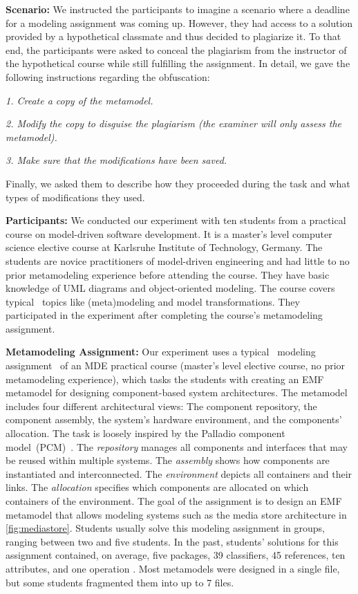 \textbf{Scenario:}
We instructed the participants to imagine a scenario where a deadline for a modeling assignment was coming up. However, they had access to a solution provided by a hypothetical classmate and thus decided to plagiarize it. To that end, the participants were asked to conceal the plagiarism from the instructor of the hypothetical course while still fulfilling the assignment.
In detail, we gave the following instructions regarding the obfuscation:

\begin{myquote}
\textit{1. Create a copy of the metamodel.}
    
\textit{2. Modify the copy to disguise the plagiarism (the examiner will only assess the metamodel).}
    
\textit{3. Make sure that the modifications have been saved.}
\end{myquote}

Finally, we asked them to describe how they proceeded during the task and what types of modifications they used.

\textbf{Participants:}
We conducted our experiment with ten students from a practical course on model-driven software development.
It is a master's level computer science elective course at Karlsruhe Institute of Technology, Germany. 
The students are novice practitioners of model-driven engineering and had little to no prior metamodeling experience before attending the course. They have basic knowledge of \ac{UML} diagrams and object-oriented modeling.
The course covers typical~\cite{Ciccozzi2018} topics like (meta)modeling and model transformations.
They participated in the experiment after completing the course's metamodeling assignment.

\textbf{Metamodeling Assignment:}
Our experiment uses a typical~\cite{Ciccozzi2018} modeling assignment~\cite{Saglam2023_supp} of an \ac{MDE} practical course (master's level elective course, no prior metamodeling experience), which tasks the students with creating an \ac{EMF} metamodel for designing component-based system architectures. The metamodel includes four different architectural views: The component repository, the component assembly, the system's hardware environment, and the components' allocation.
The task is loosely inspired by the Palladio component model~(PCM)~\cite{reussner2016a}.
%
The \textit{repository} manages all components and interfaces that may be reused within multiple systems. The \textit{assembly} shows how components are instantiated and interconnected. The \textit{environment} depicts all containers and their links. The \textit{allocation} specifies which components are allocated on which containers of the environment.
%
The goal of the assignment is to design an \ac{EMF} metamodel that allows modeling systems such as the media store architecture in \autoref{fig:mediastore}.
%
Students usually solve this modeling assignment in groups, ranging between two and five students. 
In the past, students' solutions for this assignment contained, on average, five packages, 39 classifiers, 45 references, ten attributes, and one operation \cite{Saglam2022}.
Most metamodels were designed in a single file, but some students fragmented them into up to 7 files.

